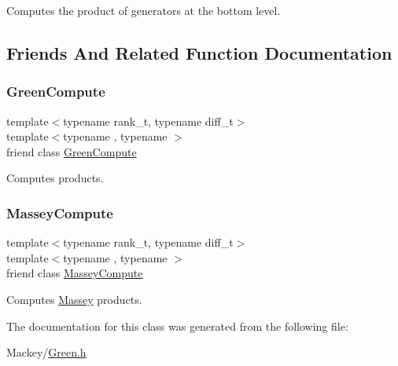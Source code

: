 Computes the product of generators at the bottom level. 

\subsection{Friends And Related Function Documentation}
\mbox{\label{classMackey_1_1internal_1_1ProductGen_a85de7c4aeeee34981e2020c2f9ddd3e2}} 
\subsubsection{\texorpdfstring{Green\+Compute}{GreenCompute}}
{\footnotesize\ttfamily template$<$typename rank\+\_\+t, typename diff\+\_\+t$>$ \\
template$<$typename , typename $>$ \\
friend class \hyperlink{classMackey_1_1internal_1_1GreenCompute}{Green\+Compute}\hspace{0.3cm}{\ttfamily [friend]}}



Computes products. 

\mbox{\label{classMackey_1_1internal_1_1ProductGen_af259bfb9b4dced17104ac8fbb697355c}} 
\subsubsection{\texorpdfstring{Massey\+Compute}{MasseyCompute}}
{\footnotesize\ttfamily template$<$typename rank\+\_\+t, typename diff\+\_\+t$>$ \\
template$<$typename , typename $>$ \\
friend class \hyperlink{structMackey_1_1internal_1_1MasseyCompute}{Massey\+Compute}\hspace{0.3cm}{\ttfamily [friend]}}



Computes \hyperlink{classMackey_1_1Massey}{Massey} products. 



The documentation for this class was generated from the following file\+:\begin{DoxyCompactItemize}
\item 
Mackey/\hyperlink{Green_8h}{Green.\+h}\end{DoxyCompactItemize}
